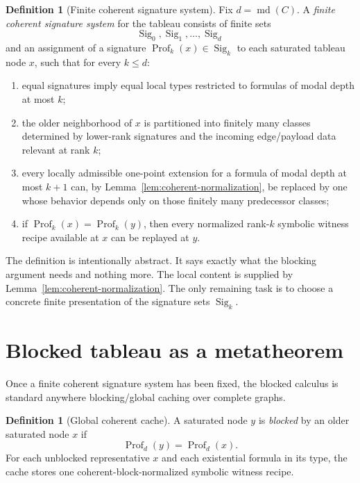 \documentclass[11pt]{article}
\theoremstyle{definition}
\newtheorem{definition}[theorem]{Definition}
\newcommand{\md}{\operatorname{md}}
\newcommand{\Prof}{\operatorname{Prof}}
\newcommand{\Sig}{\operatorname{Sig}}
\begin{document}
\begin{definition}[Finite coherent signature system]\label{def:signatures}
Fix $d=\md(C)$. A \emph{finite coherent signature system} for the tableau consists of finite sets
\[
\Sig_0,\Sig_1,\dots,\Sig_d
\]
and an assignment of a signature $\Prof_k(x)\in\Sig_k$ to each saturated tableau node $x$, such that for every $k\le d$:
\begin{enumerate}[label=(\roman*)]
  \item equal signatures imply equal local types restricted to formulas of modal depth at most $k$;
  \item the older neighborhood of $x$ is partitioned into finitely many classes determined by lower-rank signatures and the incoming edge/payload data relevant at rank $k$;
  \item every locally admissible one-point extension for a formula of modal depth at most $k+1$ can, by Lemma~\ref{lem:coherent-normalization}, be replaced by one whose behavior depends only on those finitely many predecessor classes;
  \item if $\Prof_k(x)=\Prof_k(y)$, then every normalized rank-$k$ symbolic witness recipe available at $x$ can be replayed at $y$.
\end{enumerate}
\end{definition}

The definition is intentionally abstract. It says exactly what the blocking argument needs and nothing more. The local content is supplied by Lemma~\ref{lem:coherent-normalization}. The only remaining task is to choose a concrete finite presentation of the signature sets $\Sig_k$.

\section{Blocked tableau as a metatheorem}

Once a finite coherent signature system has been fixed, the blocked calculus is standard anywhere blocking/global caching over complete graphs.

\begin{definition}[Global coherent cache]
A saturated node $y$ is \emph{blocked} by an older saturated node $x$ if
\[
\Prof_d(y)=\Prof_d(x).
\]
For each unblocked representative $x$ and each existential formula in its type, the cache stores one coherent-block-normalized symbolic witness recipe.
\end{definition}
\end{document}
